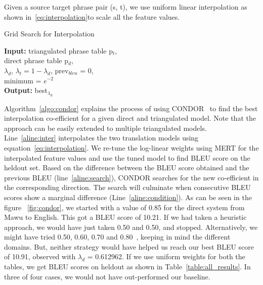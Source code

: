        Given a source target phrase pair (s, t), we use uniform linear interpolation as shown in~\eqref{eq:interpolation}to scale all the feature values. 
         \begin{algorithm}
                \caption{Grid Search for Interpolation}
                \label{algo:condor}
                \textbf{Input:} triangulated phrase table p$_{t}$, \\ direct phrase table p$_{d}$, \\
                $\lambda_{d}$, $\lambda_{t} = 1 - \lambda_{d}$, prev$_{bleu}$ = 0, \\
                minimum = $e ^{-2}$ \\
                \textbf{Output:} best$_{\lambda_{d}}$


                \begin{algorithmic}[l]
                         \label{aline:condition}
                         \label{aline:inter}
                         \label{aline:search}
                        \ENDWHILE
                       \end{algorithmic}
        \end{algorithm}

       Algorithm~\ref{algo:condor} explains the process of using CONDOR~\cite{condor-practice} to find the best interpolation co-efficient for a given direct and triangulated model. Note that the approach can be easily extended to multiple triangulated models. Line~\ref{aline:inter} interpolates the two translation models using equation~\eqref{eq:interpolation}. We re-tune the log-linear weights using MERT for the interpolated feature values and use the tuned model to find BLEU score on the heldout set. Based on the difference between the BLEU score obtained and the previous BLEU (line~\ref{aline:search}), CONDOR searches for the new co-efficient in the corresponding direction. The search will culminate when consecutive BLEU scores show a marginal difference (Line~\ref{aline:condition}). As can be seen in the figure ~\ref{fig:condor}, we started with a value of 0.85 for the direct system from Mawu to English. This got a BLEU score of 10.21. If we had taken a heuristic approach, we would have just taken 0.50 and 0.50, and stopped. Alternatively, we might have tried 0.50, 0.60, 0.70 and 0.80~\cite{Nakov:12}, keeping in mind the different domains. But, neither strategy would have helped us reach our best BLEU score of 10.91, observed with $\lambda_{d}$ = 0.612962. If we use uniform weights for both the tables, we get BLEU scores on heldout as shown in Table~\ref{table:all_results}. In three of four cases, we would not have out-performed our baseline.


